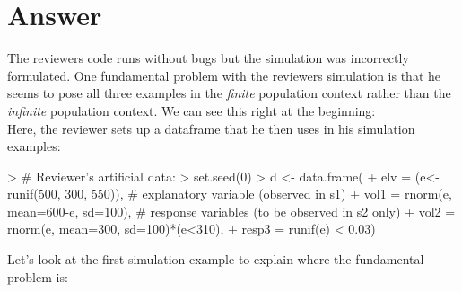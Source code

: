 \documentclass{article}
\begin{document}

\section{Answer}

The reviewers code runs without bugs but the simulation was incorrectly formulated. One fundamental problem with the reviewers simulation is that he seems to pose all three examples in the \textit{finite} population context rather than the \textit{infinite} population context. We can see this right at the beginning:\\

Here, the reviewer sets up a dataframe that he then uses in his simulation examples:

\begin{small}
\begin{Schunk}
\begin{Sinput}
> # Reviewer's artificial data:
> set.seed(0)
> d <- data.frame(
+           elv = (e<-runif(500, 300, 550)),     # explanatory variable (observed in s1)
+           vol1 = rnorm(e, mean=600-e, sd=100), # response variables (to be observed in s2 only)
+           vol2 = rnorm(e, mean=300, sd=100)*(e<310),
+           resp3 = runif(e) < 0.03)
\end{Sinput}
\end{Schunk}
\end{small}

Let's look at the first simulation example to explain where the fundamental problem is:

\begin{small}
\begin{Schunk}
\end{Schunk}
\end{small}
\end{document}
